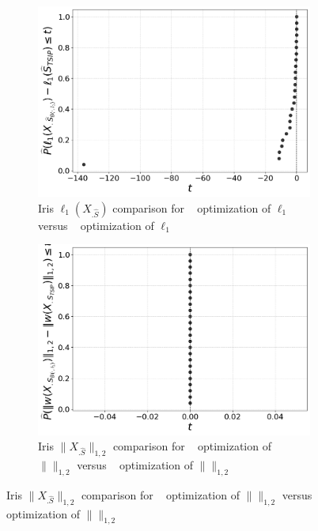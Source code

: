 \begin{figure}[t]
    \centering
    \begin{subfigure}[b]{0.45\textwidth}
        \centering
        \includegraphics[width=\textwidth]{../figures/iris_isometry_losses_iso_ecdf}
        \caption{Iris $\ell_1(X_{.\widehat S})$ comparison for \brute~ optimization of $\ell_1$ versus \tsip~ optimization of $\ell_1$}
        \label{fig:iris_isometry_losses_ecdf}
    \end{subfigure}
    \hfill
    \begin{subfigure}[b]{0.45\textwidth}
        \centering
        \includegraphics[width=\textwidth]{../figures/iris_isometry_losses_ts_ecdf}
        \caption{Iris $\|X_{.\widehat S}\|_{1,2}$ comparison for \brute~ optimization of $\|\|_{1,2}$ versus \tsip~ optimization of $\|\|_{1,2}$}
        \label{fig:iris_multitask_losses_ecdf}
    \end{subfigure}


\end{figure}
